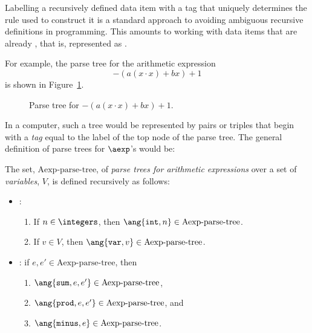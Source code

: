 \begin{definition}
\begin{editingnotes}
Labelling a recursively defined data item with a tag that uniquely
determines the rule used to construct it is a standard approach to
avoiding ambiguous recursive definitions in programming.  This
amounts to working with data items that are already , that
is, represented as .

For example, the parse tree for the arithmetic expression
\begin{equation}\label{ax}
-(a(x\cdot x)+ bx) + 1
\end{equation}
is shown in Figure~\ref{fig:parse}.

\begin{figure}
\caption{Parse tree for $-(a(x\cdot x)+ bx) + 1$.}
\label{fig:parse}
\end{figure}

In a computer, such a tree would be represented by pairs or triples
that begin with a
\emph{tag} equal to the label of the top node of the parse tree.  
The general definition of parse trees for $\aexp$'s would be:

\newcommand{\paexp}{\text{Aexp-parse-tree}}

\begin{definition}\label{arithparse}
The set, $\paexp$, of \emph{parse trees for arithmetic expressions} 
over a set of
\emph{variables}, $V$, is defined recursively as follows:
\begin{itemize}
\item {}:
\begin{enumerate}
\item If $n \in \integers$, then $\ang{\texttt{int}, n} \in \paexp$.
\item If $v \in V$, then $\ang{\texttt{var}, v} \in \paexp$.
\end{enumerate}
\item {}: if $e,e' \in \paexp$, then
\begin{enumerate}
\item $\ang{\texttt{sum}, e, e'} \in \paexp$,
\item $\ang{\texttt{prod}, e, e'} \in \paexp$, and
\item $\ang{\texttt{minus}, e} \in \paexp$.
\end{enumerate}
\end{itemize}
\end{definition}


\end{editingnotes}
\end{definition}
